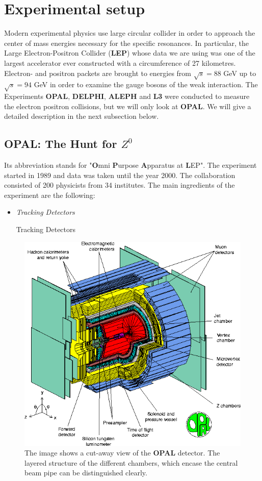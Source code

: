 \section{Experimental setup}
\label{sec:experimental_setup_}
Modern experimental physics use large circular collider in order to approach the center of mass energies necessary for the
specific resonances. In particular, the Large Electron-Positron Collider (\textbf{LEP}) whose data we are using was one
of the largest accelerator ever constructed with a circumference of 27 kilometres. Electron- and positron packets are brought
to energies from $\sqrt{s} = 88$ GeV up to $\sqrt{s} = 94$ GeV in order to examine the gauge bosons of the weak interaction. 
The Experiments \textbf{OPAL}, \textbf{DELPHI}, \textbf{ALEPH} and \textbf{L3} were conducted to measure the electron positron
collisions, but we will only look at \textbf{OPAL}. 
We will give a detailed description in the next
subsection below.


\subsection{\textbf{OPAL}: The Hunt for $Z^0$}
\label{sub:OPAL}
Its abbreviation stands for  "\textbf{O}mni \textbf{P}urpose \textbf{A}pparatus at \textbf{L}EP". The experiment started in
1989 and data was taken until the year 2000. The collaboration consisted of 200 physicists from 34 institutes.
The main ingredients of the experiment are the following: 
\begin{itemize}
    \item \emph{Tracking Detectors} 
    \item[Tracking Detectors]
\end{itemize}
\begin{figure}[htpb]
    \centering
    \includegraphics[width=1.0\linewidth]{figures/opal}
    \caption{The image shows a cut-away view of the \textbf{OPAL} detector\cite{CERN_OPAL}. The layered structure of the
    different chambers, which encase the central beam pipe can be distinguished clearly. 
    }
    \label{fig:opal1}
\end{figure}

